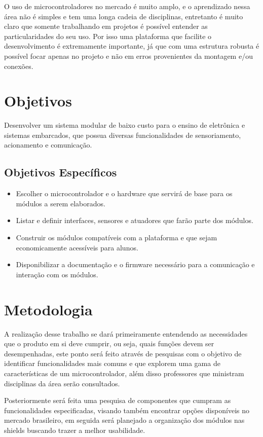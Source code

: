 O uso de microcontroladores no mercado é muito amplo, e o aprendizado nessa área não é simples e tem uma longa cadeia de disciplinas, entretanto é muito claro que somente trabalhando em projetos é possível entender as particularidades do seu uso. Por isso uma plataforma que facilite o desenvolvimento é extremamente importante, já que com uma estrutura robusta é possível focar apenas no projeto e não em erros provenientes da montagem e/ou conexões.

\section{Objetivos}

Desenvolver um sistema modular de baixo custo para o ensino de eletrônica e sistemas embarcados, que possua diversas funcionalidades de sensoriamento, acionamento e comunicação.

\subsection{Objetivos Específicos}

\begin{itemize}
	\item Escolher o microcontrolador e o hardware que servirá de base para os módulos a serem elaborados.
	\item Listar e definir interfaces, sensores e atuadores que farão parte dos módulos.
	\item Construir os módulos compatíveis com a plataforma e que sejam economicamente acessíveis para alunos.
	\item Disponibilizar a documentação e o firmware necessário para a comunicação e interação com os módulos.
\end{itemize}

\section{Metodologia}

A realização desse trabalho se dará primeiramente entendendo as necessidades que o produto em si deve cumprir, ou seja, quais funções devem ser desempenhadas, este ponto será feito através de pesquisas com o objetivo de identificar funcionalidades mais comuns e que explorem uma gama de características de um microcontrolador, além disso professores que ministram disciplinas da área serão consultados.

Posteriormente será feita uma pesquisa de componentes que cumpram as funcionalidades especificadas, visando também encontrar opções disponíveis no mercado brasileiro, em seguida será planejado a organização dos módulos nas shields buscando trazer a melhor usabilidade.

